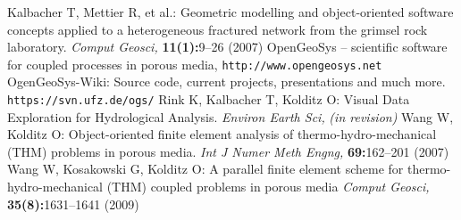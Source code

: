 {}

\begin{thebibliography}{}
Kalbacher T, Mettier R, et al.: Geometric modelling and object-oriented software concepts applied to a heterogeneous fractured network from the grimsel rock laboratory.
\textit{Comput Geosci,} \textbf{11(1):}9--26 (2007)
OpenGeoSys -- scientific software for coupled processes in porous media,
\texttt{http://www.opengeosys.net}
OgenGeoSys-Wiki: Source code, current projects, presentations and much more. \texttt{https://svn.ufz.de/ogs/}
Rink K, Kalbacher T, Kolditz O: Visual Data Exploration for Hydrological Analysis. \textit{Environ Earth Sci,} \textit{(in revision)}
Wang W, Kolditz O: Object-oriented finite element analysis of thermo-hydro-mechanical (THM) problems in porous media.
\textit{Int J Numer Meth Engng,} \textbf{69:}162--201 (2007)
Wang W, Kosakowski G, Kolditz O: A parallel finite element scheme for thermo-hydro-mechanical (THM) coupled problems in porous media \textit{Comput Geosci,} \textbf{35(8):}1631--1641 (2009)

\end{thebibliography}